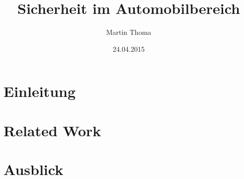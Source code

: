 \documentclass{IEEEtran}
\begin{document}
\title{Sicherheit im Automobilbereich}
\author{Martin Thoma}
\date{24.04.2015}
\maketitle

\begin{abstract}%

\end{abstract}

\section{Einleitung}


\section{Related Work}


% 

% 

% 

\section{Ausblick}


%


\end{document}

